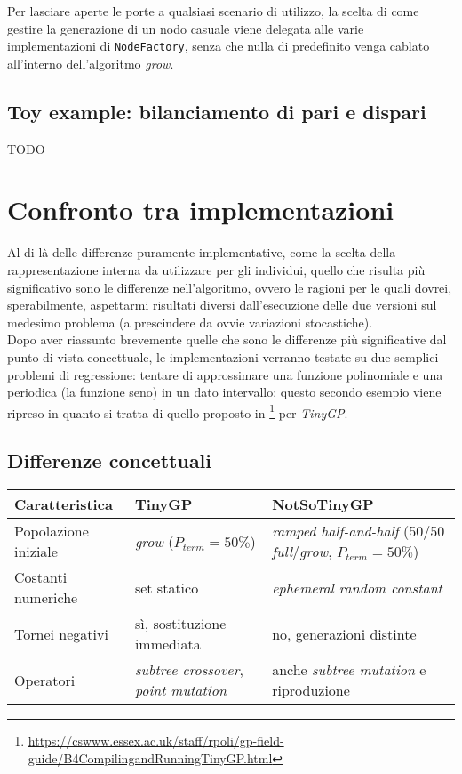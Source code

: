 \documentclass{../llncs}
\begin{document}
Per lasciare aperte le porte a qualsiasi scenario di utilizzo, la scelta di come gestire la generazione di un nodo casuale viene delegata alle varie implementazioni di \texttt{NodeFactory}, senza che nulla di predefinito venga cablato all'interno dell'algoritmo \emph{grow}.

\subsection{Toy example: bilanciamento di pari e dispari}
TODO

\section{Confronto tra implementazioni}
Al di là delle differenze puramente implementative, come la scelta della rappresentazione interna da utilizzare per gli individui, quello che risulta più significativo sono le differenze nell'algoritmo, ovvero le ragioni per le quali dovrei, sperabilmente, aspettarmi risultati diversi dall'esecuzione delle due versioni sul medesimo problema (a prescindere da ovvie variazioni stocastiche).\\

Dopo aver riassunto brevemente quelle che sono le differenze più significative dal punto di vista concettuale, le implementazioni verranno testate su due semplici problemi di regressione: tentare di approssimare una funzione polinomiale e una periodica (la funzione seno) in un dato intervallo; questo secondo esempio viene ripreso in quanto si tratta di quello proposto in \footnote{\url{https://cswww.essex.ac.uk/staff/rpoli/gp-field-guide/B4CompilingandRunningTinyGP.html}} per \emph{TinyGP}.

\subsection{Differenze concettuali}

\begin{table}
\begin{tabular}{l | p{3.7cm} | p{4.3cm}}
\textbf{Caratteristica} & \textbf{TinyGP} & \textbf{NotSoTinyGP} \\ \hline
Popolazione iniziale & \emph{grow} ($P_{term}=50\%$) & \emph{ramped half-and-half} (50/50 \emph{full}/\emph{grow}, $P_{term}=50\%$) \\ \hline
Costanti numeriche & set statico & \emph{ephemeral random constant} \\ \hline
Tornei negativi & sì, sostituzione immediata & no, generazioni distinte \\ \hline
Operatori & \emph{subtree crossover}, \emph{point mutation} & anche \emph{subtree mutation} e riproduzione \\
\end{tabular}
\end{table}
\end{document}
